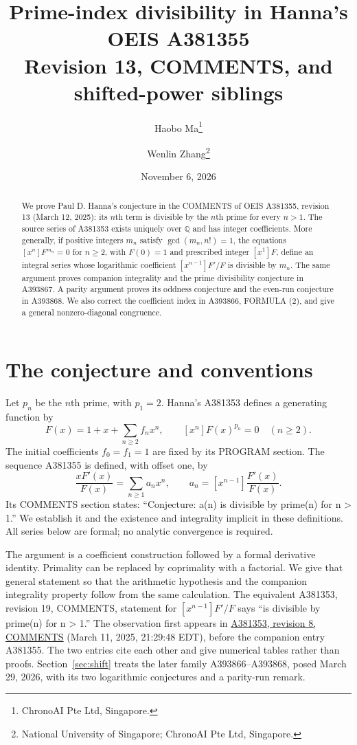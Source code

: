 \documentclass[11pt]{article}
\title{Prime-index divisibility in Hanna's OEIS A381355\\
\large Revision 13, COMMENTS, and shifted-power siblings}
\author{Haobo Ma\thanks{ChronoAI Pte Ltd, Singapore.}\and
Wenlin Zhang\thanks{National University of Singapore; ChronoAI Pte Ltd, Singapore.}}
\date{November 6, 2026}
\newcommand{\coeff}[1]{[x^{#1}]}
\begin{document}
\maketitle
\begin{abstract}
We prove Paul D. Hanna's conjecture in the COMMENTS of OEIS A381355,
revision 13 (March 12, 2025): its $n$th term is divisible by the $n$th
prime for every $n>1$. The source series of A381353 exists uniquely over
$\mathbb Q$ and has integer coefficients. More generally, if positive
integers $m_n$ satisfy $\gcd(m_n,n!)=1$, the equations
$\coeff n F^{m_n}=0$ for $n\ge2$, with $F(0)=1$ and prescribed integer
$\coeff1F$, define an integral series whose logarithmic coefficient
$\coeff{n-1}F'/F$ is divisible by $m_n$.
The same argument proves companion integrality and the prime divisibility
conjecture in A393867. A parity argument proves its oddness conjecture and
the even-run conjecture in A393868. We also correct the coefficient index
in A393866, FORMULA (2), and give a general nonzero-diagonal congruence.
\end{abstract}

\section{The conjecture and conventions}
Let $p_n$ be the $n$th prime, with $p_1=2$. Hanna's A381353
\cite{source} defines a generating function by
\begin{equation}\label{eq:source}
 F(x)=1+x+\sum_{n\ge2}f_nx^n,\qquad \coeff n F(x)^{p_n}=0\quad(n\ge2).
\end{equation}
The initial coefficients $f_0=f_1=1$ are fixed by its PROGRAM section.
The sequence A381355 \cite{target} is defined, with offset one, by
\begin{equation}\label{eq:target}
 \frac{xF'(x)}{F(x)}=\sum_{n\ge1}a_nx^n,
 \qquad a_n=\coeff{n-1}\frac{F'(x)}{F(x)}.
\end{equation}
Its COMMENTS section states: ``Conjecture: a(n) is divisible by prime(n)
for n > 1.'' We establish it and the existence and integrality implicit
in these definitions. All series below are formal; no analytic convergence
is required.

The argument is a coefficient construction followed by a formal derivative
identity. Primality can be replaced by coprimality with a factorial.
We give that general statement so that the arithmetic hypothesis and the
companion integrality property follow from the same calculation.
The equivalent A381353, revision 19, COMMENTS, statement for
$\coeff{n-1}F'/F$ says ``is divisible by prime(n) for n > 1.''
The observation first appears in
\href{https://oeis.org/history/view?seq=A381353&v=8}{A381353, revision 8, COMMENTS}
(March 11, 2025, 21:29:48 EDT), before the companion entry A381355.
The two entries cite each other and give numerical tables rather than proofs.
Section~\ref{sec:shift} treats the later family A393866--A393868, posed
March 29, 2026, with its two logarithmic conjectures and a parity-run remark.
\end{document}
